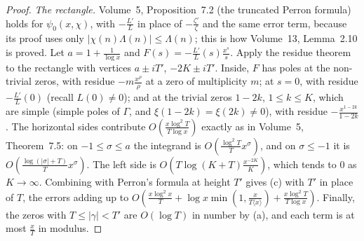 \begin{proof}
\emph{The rectangle.} Volume~5, Proposition~7.2 (the truncated Perron formula) holds for $\psi_0(x,\chi)$, with $-\frac{L'}L$ in place of $-\frac{\zeta'}\zeta$ and the same error term, because its proof uses only $|\chi(n)\Lambda(n)|\le\Lambda(n)$; this is how Volume~13, Lemma~2.10 is proved. Let $a=1+\frac1{\log x}$ and $F(s)=-\frac{L'}L(s)\frac{x^s}s$. Apply the residue theorem to the rectangle with vertices $a\pm iT'$, $-2K\pm iT'$. Inside, $F$ has poles at the non-trivial zeros, with residue $-m\frac{x^\rho}\rho$ at a zero of multiplicity $m$; at $s=0$, with residue $-\frac{L'}L(0)$ (recall $L(0)\ne0$); and at the trivial zeros $1-2k$, $1\le k\le K$, which are simple (simple poles of $\Gamma$, and $\xi(1-2k)=\xi(2k)\ne0$), with residue $-\frac{x^{1-2k}}{1-2k}$. The horizontal sides contribute $O(\frac{x\log^2T}{T\log x})$ exactly as in Volume~5, Theorem~7.5: on $-1\le\sigma\le a$ the integrand is $O(\frac{\log^2T}Tx^\sigma)$, and on $\sigma\le-1$ it is $O(\frac{\log(|\sigma|+T)}Tx^\sigma)$. The left side is $O(T\log(K+T)\frac{x^{-2K}}{K})$, which tends to $0$ as $K\to\infty$. Combining with Perron's formula at height $T'$ gives (c) with $T'$ in place of $T$, the errors adding up to $O(\frac{x\log^2x}T+\log x\min(1,\frac x{T\langle x\rangle})+\frac{x\log^2T}{T\log x})$. Finally, the zeros with $T\le|\gamma|<T'$ are $O(\log T)$ in number by (a), and each term is at most $\frac xT$ in modulus.
\end{proof}

